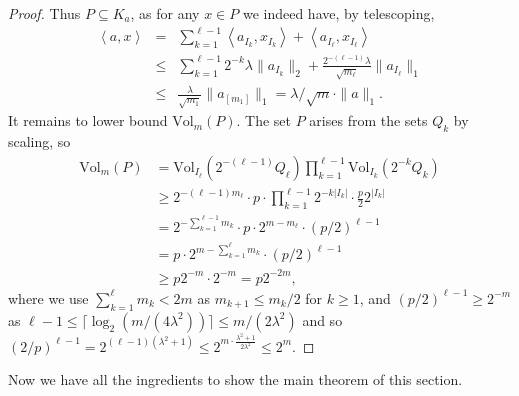 \documentclass[12pt,english]{article}
\theoremstyle{theorem}
\theoremstyle{remark}
\newcommand{\Vol}{\mathrm{Vol}}
\begin{document}
\begin{proof}
Thus $P \subseteq K_a$, as for any $x\in P$ we indeed have, by telescoping,
 \begin{eqnarray*}
     \left<a,x\right> &=& \sum_{k=1}^{\ell-1} 
\left<a_{I_k},x_{I_k}\right> +
\left<a_{I_{\ell}},x_{I_{\ell}}\right> \\
     &\leq& \sum_{k=1}^{\ell-1} 2^{-k} \lambda \|a_{I_k}\|_2 + \frac{2^{-(\ell-1)} \lambda}{\sqrt{m_\ell}}\|a_{I_{\ell}}\|_1
  \\   &\leq& \frac{\lambda}{\sqrt{m_1}} \|a_{[m_1]}\|_1 =\lambda/\sqrt{m} \cdot \|a\|_1.
   \end{eqnarray*}
   It remains to lower bound $\Vol_m (P)$. The set $P$ arises from the sets $Q_k$ by scaling, so
\[
\begin{aligned}
        \Vol_m(P)
        &=
        \Vol_{I_\ell}(2^{-(\ell-1)} Q_\ell)
        \prod_{k=1}^{\ell-1}\Vol_{I_k}( 2^{-k} Q_k) \\
         & \ge 2^{-(\ell-1) m_\ell} \cdot p \cdot 
        \prod_{k=1}^{\ell-1} 2^{-k |I_k|}
        \cdot \tfrac{p}{2} 2^{|I_k|} \\
        &= 2^{-\sum_{k=1}^{\ell-1} m_k}\cdot 
        p \cdot 2^{m-m_\ell} \cdot (p/2)^{\ell-1} \\
        &=
        p \cdot 2^{m-\sum_{k=1}^{\ell} m_k} \cdot (p/2)^{\ell-1} \\
        & \ge p 2^{-m} \cdot 2^{-m} = p 2^{-2m},
        \end{aligned}
\]
where we use $\sum_{k=1}^\ell m_k < 2m$ as $m_{k+1} \le m_k /2$ for $k \ge 1$, and $(p/2)^{\ell-1} \ge 2^{-m}$ as $\ell-1 \le \lceil \log_2 (m/(4\lambda^2)) \rceil \le m/(2\lambda^2)$ and so $(2/p)^{\ell-1} = 2^{(\ell-1)(\lambda^2+1)} \le 2^{m \cdot \frac{\lambda^2+1}{2\lambda^2}} \le 2^m$.
\end{proof}



Now we have all the ingredients to show the main theorem of this section.
\end{document}
